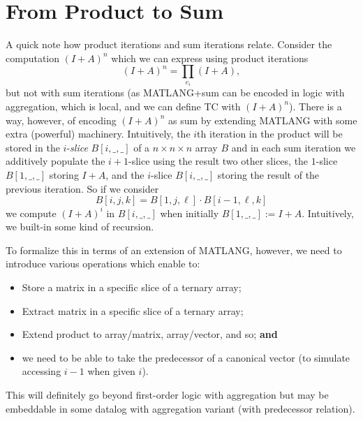 \section{From Product to Sum} \label{sec:prodtosum}

A quick note how product iterations and sum iterations relate.
Consider the computation $(I+A)^n$ which we can express using
product iterations 
$$
(I+A)^n=\prod_{e_i} (I+A),
$$
but not with sum iterations (as  MATLANG+sum can be encoded in
logic with aggregation,  which is local, and we can define TC with
$(I+A)^n$). There is a way, however, of encoding $(I+A)^n$ as sum
by extending MATLANG with some extra (powerful) machinery. Intuitively,
the $i$th iteration in the product will  be stored in the $i$-\textit{slice} $B[i,\_,\_]$ of a $n\times n\times n$
array $B$ and in each sum iteration we additively populate the $i+1$-slice using the
result two other slices, the $1$-slice $B[1,\_,\_]$ storing $I+A$, and the $i$-slice $B[i,\_,\_]$
storing the result of the previous iteration. So if we consider
$$
B[i,j,k]=B[1,j,\ell]\cdot B[i-1,\ell,k]
$$
we compute $(I+A)^i$ in $B[i,\_,\_]$ when initially $B[1,\_,\_]:=I+A$. Intuitively, we built-in some kind of recursion.

To formalize this in terms of an extension of MATLANG, however, we need to introduce various operations which enable to:
\begin{itemize}
\item Store a matrix in a specific slice of a ternary array;
\item Extract matrix in a specific slice of a ternary array;
\item Extend product to array/matrix, array/vector, and so; {\bf and}
\item we need to be able to take the predecessor of a canonical vector (to simulate accessing $i-1$ when given $i$).
\end{itemize}

This will definitely go beyond first-order logic with aggregation but may be embeddable in some datalog with aggregation variant (with predecessor relation).

